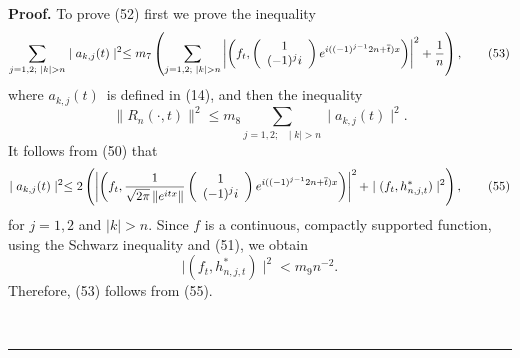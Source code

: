 \documentclass{article}%
\newenvironment{proof}[1][Proof]{\textbf{#1.} }{\ \rule{0.5em}{0.5em}}
\begin{document}
\begin{proof}
To prove (52) first we prove the inequality
\begin{equation}
\sum_{j=1,2;\text{ }\mid k\mid>n}\mid a_{k,j}(t)\mid^{2}\leq m_{7}\left(
\sum_{j=1,2;\text{ }\mid k\mid>n}\left\vert \left(  f_{t},\left(
\begin{array}
[c]{c}%
1\\
(-1)^{j}i
\end{array}
\right)  e^{i((-1)^{j-1}2n+\overline{t})x}\right)  \right\vert ^{2}+\frac
{1}{n}\right)  , \tag{53}%
\end{equation}
where $a_{k,j}(t)$\ is defined in (14), and then the inequality
\begin{equation}
\parallel R_{n}(\cdot,t)\parallel^{2}\leq m_{8}\sum_{j=1,2;\text{ }\mid
k\mid>n}\mid a_{k,j}(t)\mid^{2}. \tag{54}%
\end{equation}
It follows from (50) that
\begin{equation}
\mid a_{k,j}(t)\mid^{2}\leq2\left(  \left\vert \left(  f_{t},\frac{1}%
{\sqrt{2\pi}\left\Vert e^{itx}\right\Vert }\left(
\begin{array}
[c]{c}%
1\\
(-1)^{j}i
\end{array}
\right)  e^{i((-1)^{j-1}2n+\overline{t})x}\right)  \right\vert ^{2}+\mid
(f_{t},h_{n,j,t}^{\ast})\mid^{2}\right)  , \tag{55}%
\end{equation}
for $j=1,2$ and $\mid k\mid>n.$ Since $f$ is a continuous, compactly supported
function, using the Schwarz inequality and (51), we obtain
\begin{equation}
\mid(f_{t},h_{n,j,t}^{\ast})\mid^{2}<m_{9}n^{-2}. \tag{56}%
\end{equation}
Therefore, (53) follows from (55).


\end{proof}
\end{document}
